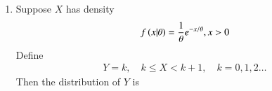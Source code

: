 \renewcommand{\theequation}{\theenumi}
\renewcommand{\thefigure}{\theenumi}
\renewcommand{\thetable}{\theenumi}
\begin{enumerate}[label=\thesection.\arabic*.,ref=\thesection.\theenumi]


\item Suppose $X$ has density 
%
\begin{align}
f\left(x|\theta\right) = \frac{1}{\theta}e^{-x/\theta}, x>0 
\end{align}
Define 
\begin{align}
    Y=k, \quad k\leq X< k+1, \quad k=0,1,2\ldots
\end{align}
%
Then the distribution of $Y$ is
\begin{enumerate}
\end{enumerate}
\solution




\end{enumerate}


